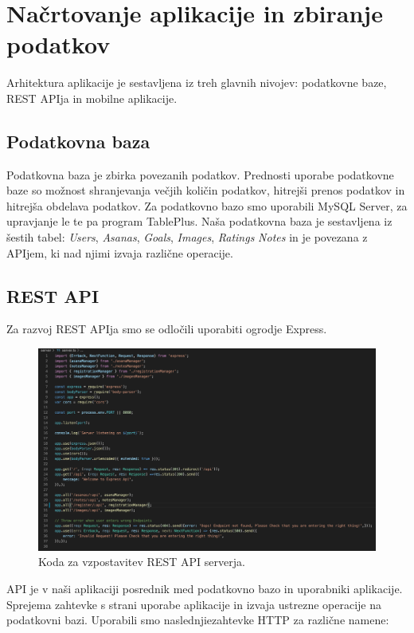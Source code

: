 \documentclass[a4paper, 12pt]{book}
\begin{document}
\section{Načrtovanje aplikacije in zbiranje podatkov}
Arhitektura aplikacije je sestavljena iz treh glavnih nivojev: podatkovne baze, REST APIja in mobilne aplikacije.

\subsection{Podatkovna baza}
Podatkovna baza je zbirka povezanih podatkov. Prednosti uporabe podatkovne baze so možnost shranjevanja večjih količin podatkov, hitrejši prenos podatkov in hitrejša obdelava podatkov. Za podatkovno bazo smo uporabili MySQL Server, za upravjanje le te pa program TablePlus. Naša podatkovna baza je sestavljena iz šestih tabel: \textit{Users}, \textit{Asanas}, \textit{Goals}, \textit{Images}, \textit{Ratings}  \textit{Notes} in je povezana z APIjem, ki nad njimi izvaja različne operacije. 

\subsection{REST API}
Za razvoj REST APIja smo se odločili uporabiti ogrodje Express. 

\begin{figure}[htbp]
\begin{center}
\includegraphics[scale=0.33]{server.jpg} 
\end{center}
\caption{Koda za vzpostavitev REST API serverja.}
\label{server}
\end{figure}

API je v naši aplikaciji posrednik med podatkovno bazo in uporabniki aplikacije. Sprejema zahtevke s strani uporabe aplikacije in izvaja ustrezne operacije na podatkovni bazi. Uporabili smo naslednjiezahtevke HTTP za različne namene:
\end{document}
